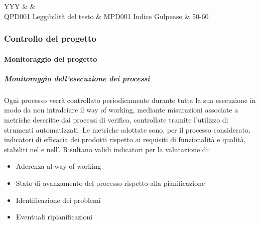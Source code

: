 			\begin{table}[H]
				\begin{detailtable}{\textwidth}{YYY}
					 &
					 &
					\\
					\hline
					QPD001 Leggibilità del testo & MPD001 Indice Gulpease & 50-60\\
					\hline
				\end{detailtable}
			\end{table}

		\subsubsection{Controllo del progetto}

			\paragraph{Monitoraggio del progetto}

			\subparagraph{Monitoraggio dell'esecuzione dei processi}
			Ogni processo verrà controllato periodicamente durante tutta la sua esecuzione in modo da non intralciare il way of working,
			mediante misurazioni associate a metriche descritte dai processi di verifica, controllate tramite l'utilizzo di strumenti automatizzati.
			Le metriche adottate sono, per il processo considerato, indicatori di efficacia dei prodotti rispetto ai requisiti di funzionalità e qualità,
			stabiliti nel \Doc{\PdQv} e nell'\Doc{\AdRv}. Risultano validi indicatori per la valutazione di:
			\begin{itemize}
				\item Aderenza al way of working
				\item Stato di avanzamento del processo rispetto alla pianificazione
				\item Identificazione dei problemi
				\item Eventuali ripianificazioni
			\end{itemize}

